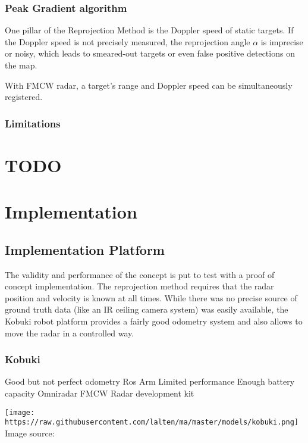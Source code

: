 \subsubsection{Peak Gradient algorithm}\label{peak-gradient-algorithm}

One pillar of the Reprojection Method is the Doppler speed of static
targets. If the Doppler speed is not precisely measured, the
reprojection angle \(\alpha\) is imprecise or noisy, which leads to
smeared-out targets or even false positive detections on the map.

With FMCW radar, a target's range and Doppler speed can be
simultaneously registered.

\subsubsection{Limitations}\label{limitations}

\section{TODO}\label{todo-2}

\section{Implementation}\label{implementation}

\subsection{Implementation Platform}\label{implementation-platform}

The validity and performance of the concept is put to test with a proof
of concept implementation. The reprojection method requires that the
radar position and velocity is known at all times. While there was no
precise source of ground truth data (like an IR ceiling camera system)
was easily available, the Kobuki robot platform provides a fairly good
odometry system and also allows to move the radar in a controlled way.

\subsubsection{Kobuki}\label{kobuki}

Good but not perfect odometry Ros Arm Limited performance Enough battery
capacity Omniradar FMCW Radar development kit

\texttt{[image: https://raw.githubusercontent.com/lalten/ma/master/models/kobuki.png]}
Image source: \cite{DesignK2013}

